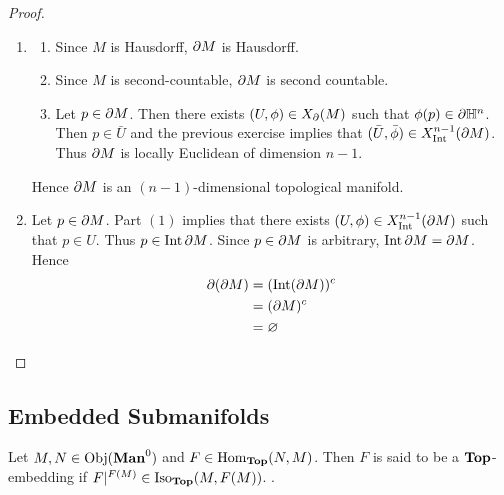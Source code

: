 \documentclass{book}
\begin{document}
\begin{proof}\
	\begin{enumerate}
		\item 
		\begin{enumerate}
			\item Since $M$ is Hausdorff, $\partial M$ is Hausdorff.
			\item Since $M$ is second-countable, $\partial M$ is second countable. 
			\item Let $p \in \partial M$. Then there exists $(U, \phi) \in X_{\partial}(M)$ such that $\phi(p) \in \partial \mathbb{H}^n$. Then $p \in \bar{U}$ and the previous exercise implies that $(\bar{U}, \bar{\phi}) \in X^{n-1}_{\operatorname{Int}}(\partial M)$. Thus $\partial M$ is locally Euclidean of dimension $n-1$.
		\end{enumerate}
		Hence $\partial M$ is an $(n-1)$-dimensional topological manifold.
		\item Let $p \in \partial M$. Part $(1)$ implies that there exists $(U, \phi) \in X^{n-1}_{\operatorname{Int}}(\partial M)$ such that $p \in U$. Thus $p \in \operatorname{Int} \partial M$. Since $p \in \partial M$ is arbitrary, $\operatorname{Int} \partial M = \partial M$. Hence 
		\begin{align*}
			\partial (\partial M)
			& = (\operatorname{Int}(\partial M))^c \\
			& = (\partial M)^c \\
			& = \varnothing
		\end{align*} 
	\end{enumerate}
\end{proof}








































\subsection{Embedded Submanifolds}

\begin{defn} 
	Let $M, N \in \operatorname{Obj}(\operatorname*{\text{\textbf{Man}}^0})$ and $F \in \operatorname{Hom}_{\operatorname*{\text{\textbf{Top}}}}(N, M)$. Then $F$ is said to be a $\operatorname*{\text{\textbf{Top}}}$-embedding if $F|^{F(M)} \in \operatorname{Iso}_{\operatorname*{\text{\textbf{Top}}}}(M,F(M))$.  .
\end{defn}
\end{document}
